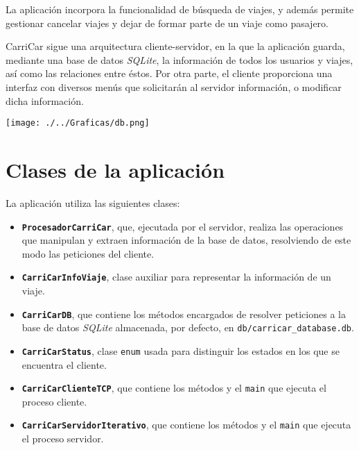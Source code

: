 \documentclass[10pt, a4paper]{article}
\theoremstyle{theorem-style}
\theoremstyle{theorem-style}
\theoremstyle{definition-style}
\theoremstyle{remark-style}
\theoremstyle{example-style}
\theoremstyle{definition-style}
\theoremstyle{remark-style}
\begin{document}
La aplicación incorpora la funcionalidad de búsqueda de viajes, y además permite gestionar cancelar viajes y dejar de formar parte de un viaje como pasajero.

CarriCar sigue una arquitectura cliente-servidor, en la que la aplicación guarda, mediante una base de datos \emph{SQLite}, la información de todos los usuarios y viajes, así como las relaciones entre éstos. Por otra parte, el cliente proporciona una interfaz con diversos menús que solicitarán al servidor información, o modificar dicha información.

\begin{center}
	\centering
	\texttt{[image: ./../Graficas/db.png]}
\end{center}


\section{Clases de la aplicación}

La aplicación utiliza las siguientes clases:
\vspace{-0.2cm}

\begin{itemize}
	\item \texttt{\textbf{ProcesadorCarriCar}}, que, ejecutada por el servidor, realiza las operaciones que manipulan y extraen información de la base de datos, resolviendo de este modo las peticiones del cliente.\vspace{-0.2cm}
	\item \texttt{\textbf{CarriCarInfoViaje}}, clase auxiliar para representar la información de un viaje.\vspace{-0.2cm}
	\item \texttt{\textbf{CarriCarDB}}, que contiene los métodos encargados de resolver peticiones a la base de datos \emph{SQLite} almacenada, por defecto, en \texttt{db/carricar\_database.db}.\vspace{-0.2cm}
	\item \texttt{\textbf{CarriCarStatus}}, clase \texttt{enum} usada para distinguir los estados en los que se encuentra el cliente.\vspace{-0.2cm}
	\item \texttt{\textbf{CarriCarClienteTCP}}, que contiene los métodos y el \texttt{main} que ejecuta el proceso cliente.\vspace{-0.2cm}
	\item \texttt{\textbf{CarriCarServidorIterativo}}, que contiene los métodos y el \texttt{main} que ejecuta el proceso servidor.\vspace{-0.2cm}
\end{itemize}
\end{document}
